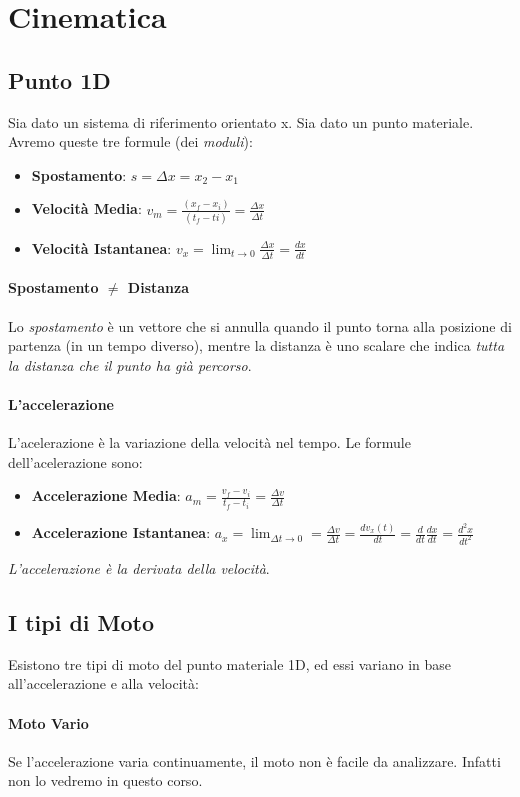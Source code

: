 \documentclass[12pt, a4paper, openany]{book}
\begin{document}
\section{Cinematica}
\subsection*{Punto 1D}
Sia dato un sistema di riferimento orientato x.
Sia dato un punto materiale.
Avremo queste tre formule (dei \emph{moduli}):
\begin{itemize}
    \item \textbf{Spostamento}: $s=\Delta x = x_2-x_1$
    \item \textbf{Velocità Media}: $v_m = \frac{(x_f-x_i)}{(t_f-ti)} = \frac{\Delta x}{\Delta t}$
    \item \textbf{Velocità Istantanea}: $v_x = \lim_{t\to 0} \frac{\Delta x}{\Delta t} = \frac{dx}{dt}$
\end{itemize}
\paragraph{Spostamento $\neq$ Distanza}
Lo \emph{spostamento} è un vettore che si annulla quando il punto torna alla posizione di partenza (in un tempo diverso),
mentre la distanza è uno scalare che indica \emph{tutta la distanza che il punto ha già percorso}.
\paragraph{L'accelerazione} L'acelerazione è la variazione della velocità nel tempo.
Le formule dell'acelerazione sono:
\begin{itemize}
    \item \textbf{Accelerazione Media}: $a_m = \frac{v_f-v_i}{t_f-t_i} = \frac{\Delta v}{\Delta t}$
    \item \textbf{Accelerazione Istantanea}: $a_x = \lim_{\Delta t \to 0} = \frac{\Delta v}{\Delta t} = \frac{dv_x(t)}{dt}= \frac{d}{dt}\frac{dx}{dt} = \frac{d^2x}{dt^2}$
\end{itemize}
\emph{L'accelerazione è la derivata della velocità}.
\subsection{I tipi di Moto}
Esistono tre tipi di moto del punto materiale 1D, ed essi variano in base all'accelerazione e alla velocità:
\paragraph*{Moto Vario} Se l'accelerazione varia continuamente, il moto non è facile da analizzare. Infatti non lo vedremo in questo corso.
\end{document}
